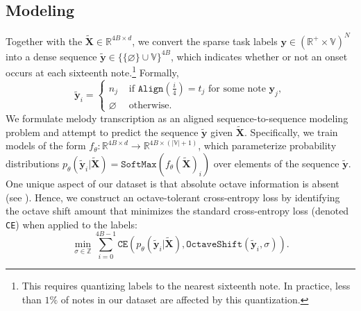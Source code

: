 \subsection{Modeling}
\label{sec:modeling}

Together with the \beatpooling{} ${\tilde{\bm{X}} \in \mathbb{R}^{4B\times d}}$, we convert 
the sparse task labels ${\bm{y} \in (\mathbb{R}^+ \times \mathbb{V})^N}$ into 
a dense sequence  
${\tilde{\bm{y}} \in \{\{\varnothing\}\cup\mathbb{V}\}^{4B}}$,
which indicates whether or not an onset occurs at each sixteenth note.\footnote{This requires quantizing labels to the nearest sixteenth note. In practice, less than $1\%$ of notes in our dataset are affected by this quantization.} Formally, 
\[
\tilde{\bm{y}}_i =
\begin{cases}
n_j & \text{ if $\texttt{Align}(\frac{i}{4}) = t_j$ for some note $\bm{y}_j$}, \\
\varnothing & \text{ otherwise}.
\end{cases}
\]
We formulate melody transcription as an aligned sequence-to-sequence modeling problem and 
attempt to predict the sequence $\tilde{\bm{y}}$ given $\tilde{\bm{X}}$. Specifically, we train models of the form ${f_{\theta} : \mathbb{R}^{4B \times d} \to \mathbb{R}^{4B \times (|\mathbb{V}| + 1)}}$, which parameterize probability distributions  ${p_\theta(\tilde{\bm{y}}_i|\bm{\tilde{X}}) = \texttt{SoftMax}(f_{\theta}(\tilde{\bm{X}})_i)}$ over elements of the sequence $\tilde{\bm{y}}$.
One unique aspect of our dataset is that absolute octave information is absent (see ). 
Hence, we construct an octave-tolerant cross-entropy loss by 
identifying the octave shift amount that minimizes the standard cross-entropy loss (denoted \texttt{CE}) when applied to the labels:
\begin{equation*}
\operatorname*{min}_{\sigma \in \mathbb{Z}} \sum_{i=0}^{4B-1} \texttt{CE}(p_\theta(\tilde{\bm{y}}_i|\bm{\tilde{X}}), \texttt{OctaveShift}(\tilde{\bm{y}}_i, \sigma)).
\end{equation*}

